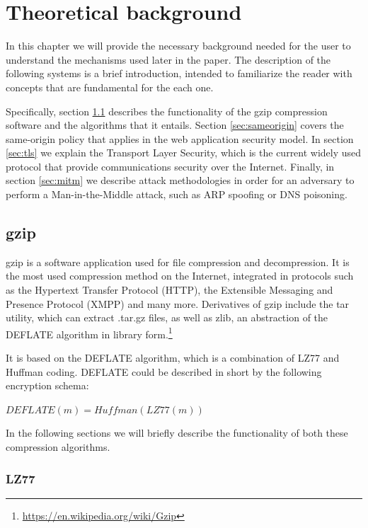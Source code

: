 \chapter{Theoretical background}\label{background}

In this chapter we will provide the necessary background needed for the user to
understand the mechanisms used later in the paper. The description of the
following systems is a brief introduction, intended to familiarize the reader
with concepts that are fundamental for the each one.

Specifically, section \ref{sec:gzip} describes the functionality of the gzip
compression software and the algorithms that it entails. Section
\ref{sec:sameorigin} covers the same-origin policy that applies in the web
application security model. In section \ref{sec:tls} we explain the Transport
Layer Security, which is the current widely used protocol that provide
communications security over the Internet. Finally, in section \ref{sec:mitm} we
describe attack methodologies in order for an adversary to perform a
Man-in-the-Middle attack, such as ARP spoofing or DNS poisoning.

\section{gzip}\label{sec:gzip}

gzip is a software application used for file compression and decompression. It
is the most used compression method on the Internet, integrated in protocols
such as the Hypertext Transfer Protocol (HTTP), the Extensible Messaging and
Presence Protocol (XMPP) and many more. Derivatives of gzip include the tar
utility, which can extract .tar.gz files, as well as zlib, an abstraction of the
DEFLATE algorithm in library
form.\footnote{\url{https://en.wikipedia.org/wiki/Gzip}}

It is based on the DEFLATE algorithm, which is a combination of LZ77 and Huffman
coding. DEFLATE could be described in short by the following encryption schema:

\begin{math}DEFLATE(m) = Huffman(LZ77(m))\end{math}

In the following sections we will briefly describe the functionality of both
these compression algorithms.

\subsection{LZ77}\label{subsec:lz77}

